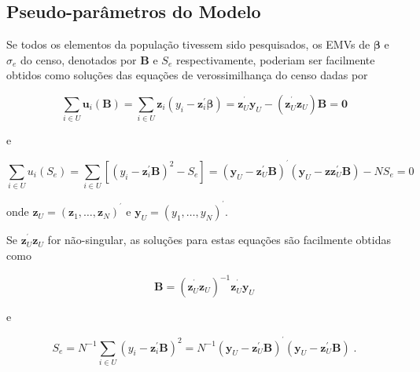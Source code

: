 \documentclass[]{book}
\theoremstyle{definition}
\theoremstyle{definition}
\theoremstyle{definition}
\theoremstyle{remark}
\begin{document}
\subsection{Pseudo-parâmetros do
Modelo}\label{pseudo-parametros-do-modelo}

Se todos os elementos da população tivessem sido pesquisados, os EMVs de
\(\mathbf{\beta }\) e \(\sigma _{e}\) do censo, denotados por
\(\mathbf{B}\) e \(S_{e}\) respectivamente, poderiam ser facilmente
obtidos como soluções das equações de verossimilhança do censo dadas por

\begin{equation}
\sum\limits_{i\in U}\mathbf{u}_{i}\left( \mathbf{B}\right)
=\sum\limits_{i\in U}\mathbf{z}_{i}\left( y_{i}-\mathbf{z}_{i}^{\prime }
\mathbf{\beta }\right) =\mathbf{z}_{U}^{^{\prime }}\mathbf{y}_{U}-\left( 
\mathbf{z}_{U}^{^{\prime }}\mathbf{z}_{U}\right) \mathbf{B}=\mathbf{0}
\label{eq:norm4}
\end{equation}

e

\begin{equation}
\sum\limits_{i\in U}u_{i}\left( S_{e}\right) =\sum\limits_{i\in U}\left[
\left( y_{i}-\mathbf{z}_{i}^{\prime }\mathbf{B}\right) ^{2}-S_{e}\right]
=\left( \mathbf{y}_{U}-\mathbf{z}_{U}^{\prime }\mathbf{B}\right) ^{^{\prime
}}\left( \mathbf{y}_{U}-\mathbf{zz}_{U}^{\prime }\mathbf{B}\right) -NS_{e}=0
\label{eq:norm5}
\end{equation}

onde
\(\mathbf{z}_{U}=\left( \mathbf{z}_{1},\ldots ,\mathbf{z}_{N}\right) ^{^{\prime }}\)
e \(\mathbf{y}_{U}=\left( y_{1},\ldots ,y_{N}\right) ^{^{\prime }}\).

Se \(\mathbf{z}_{U}^{^{\prime }}\mathbf{z}_{U}\) for não-singular, as
soluções para estas equações são facilmente obtidas como

\begin{equation}
\mathbf{B}=\left( \mathbf{z}_{U}^{^{\prime }}\mathbf{z}_{U}\right) ^{-1}
\mathbf{z}_{U}^{^{\prime }}\mathbf{y}_{U}  
\label{eq:norm6}
\end{equation}

e

\begin{equation}
S_{e}=N^{-1}\sum\limits_{i\in U}\left( y_{i}-\mathbf{z}_{i}^{\prime }\mathbf{
B}\right) ^{2}=N^{-1}\left( \mathbf{y}_{U}-\mathbf{z}_{U}^{\prime }\mathbf{B}
\right) ^{^{\prime }}\left( \mathbf{y}_{U}-\mathbf{z}_{U}^{\prime }\mathbf{B}
\right) \;.  
\label{eq:norm7}
\end{equation}
\end{document}
